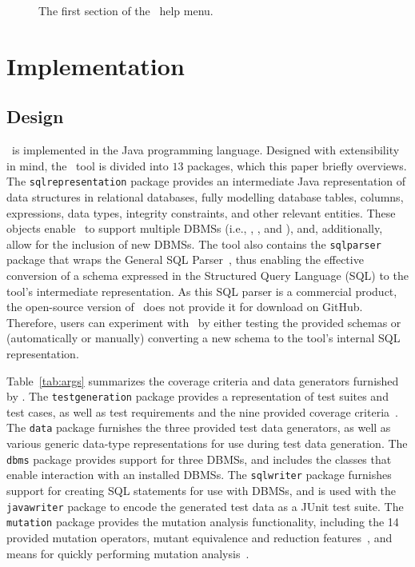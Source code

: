 \begin{figure}

\caption{\label{fig:usage} The first section of the \sa~help menu.}
\vspace*{-.1in}
\end{figure}

\section{Implementation}\label{sec:implementation}
\subsection{Design}


\sa~is implemented in the Java programming language.  Designed with extensibility in mind, the \sa~tool is divided into
$13$ packages, which this paper briefly overviews. The \texttt{sqlrepresentation} package provides an intermediate Java
representation of data structures in relational databases, fully modelling database tables, columns, expressions, data
types, integrity constraints, and other relevant entities. These objects enable \sa~to support multiple DBMSs (i.e.,
\sqlite, \postgres, and \hypersql), and, additionally, allow for the inclusion of new DBMSs. The tool also contains the
\texttt{sqlparser} package that wraps the General SQL Parser~\cite{generalsqlparser}, thus enabling the effective
conversion of a schema expressed in the Structured Query Language (SQL) to the tool's intermediate representation. As
this SQL parser is a commercial product, the open-source version of \sa~does not provide it for download on GitHub.
Therefore, users can experiment with \sa~by either testing the provided schemas or (automatically or manually)
converting a new schema to the tool's internal SQL representation.


Table~\ref{tab:args} summarizes the coverage criteria and data generators furnished by \sa. The \texttt{testgeneration}
package provides a representation of test suites and test cases, as well as test requirements and the nine provided
coverage criteria~\cite{mcminn2015effectiveness}.  The \texttt{data} package furnishes the three provided test data
generators, as well as various generic data-type representations for use during test data generation. The \texttt{dbms}
package provides support for three DBMSs, and includes the classes that enable interaction with an installed DBMSs. The
\texttt{sqlwriter} package furnishes support for creating SQL statements for use with DBMSs, and is used with the
\texttt{javawriter} package to encode the generated test data as a JUnit test suite.  The \texttt{mutation} package
provides the mutation analysis functionality, including the 14 provided mutation operators, mutant equivalence and
reduction features~\cite{wright2014impact}, and means for quickly performing mutation analysis~\cite{mcminn2016virtual}.

